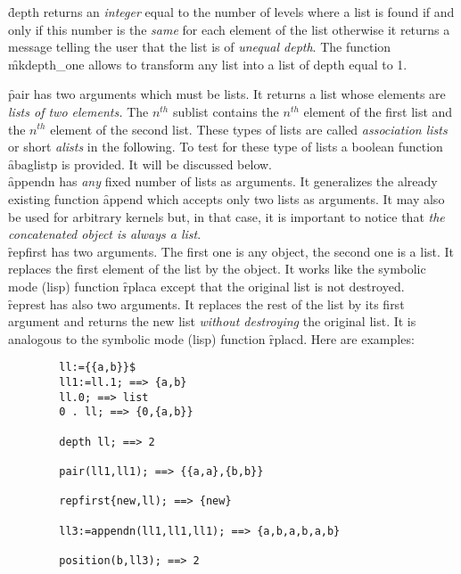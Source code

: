 \begin{itemize}
\f{depth} returns an \emph{integer} equal to the number of levels where a
list is found if and only if this number is the \emph{same} for each
element of the list  otherwise it returns a message telling the user
that the list is of \emph{unequal depth}. The function \f{mkdepth\_one}
allows to transform any list into a list of depth equal to 1.

\f{pair} has two arguments which must be lists. It returns a list
whose elements are \emph{lists of two elements.}
The $n^{th}$ sublist contains the $n^{th}$ element of the first list
and the $n^{th}$ element of the second list. These types of lists are called
\emph{association lists} or short \emph{alists} in the following.
To test for these type of lists a boolean function \f{abaglistp}
is provided. It will be discussed below.\\
\f{appendn} has \emph{any} fixed number of lists as arguments. It
generalizes the already existing function \f{append} which accepts
only two lists as arguments. It may also be used for arbitrary kernels 
but, in that case, it is important to notice that \emph{the concatenated 
object is always a list}.\\
\f{repfirst} has two arguments. The first one is any object, the second one
is a list. It replaces the first element of the list by the object. It
works like the symbolic mode (lisp) function \f{rplaca} except that the
original list is not destroyed.\\
\f{represt} has also two arguments. It replaces the rest of the list by
its first argument and returns the new list \emph{without destroying} the
original list. It is analogous to the symbolic mode (lisp) function \f{rplacd}.
Here are examples:
\begin{verbatim}
        ll:={{a,b}}$
        ll1:=ll.1; ==> {a,b}
        ll.0; ==> list
        0 . ll; ==> {0,{a,b}}

        depth ll; ==> 2

        pair(ll1,ll1); ==> {{a,a},{b,b}}

        repfirst{new,ll); ==> {new}

        ll3:=appendn(ll1,ll1,ll1); ==> {a,b,a,b,a,b}

        position(b,ll3); ==> 2


\end{verbatim}
\end{itemize}
